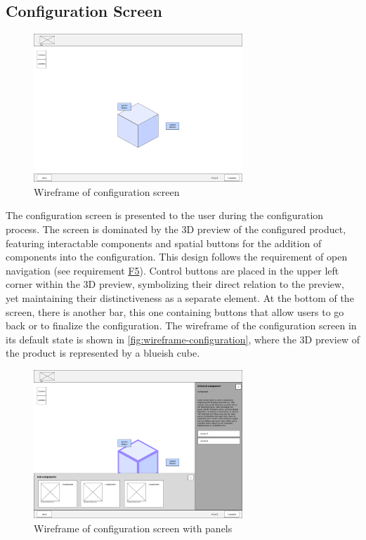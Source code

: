 \subsection{Configuration Screen}

\begin{figure}[h]
\centering
\includegraphics[width=0.7\textwidth]{images/wireframe_configuration_default.png}
\caption{Wireframe of configuration screen}
\label{fig:wireframe-configuration}
\end{figure}


The configuration screen is presented to the user during the configuration process. The screen is dominated by the 3D preview of the configured product, featuring interactable components and spatial buttons for the addition of components into the configuration. This design follows the requirement of open navigation (see requirement \hyperref[itm:F5]{F5}). Control buttons are placed in the upper left corner within the 3D preview, symbolizing their direct relation to the preview, yet maintaining their distinctiveness as a separate element. At the bottom of the screen, there is another bar, this one containing buttons that allow users to go back or to finalize the configuration. The wireframe of the configuration screen in its default state is shown in \autoref{fig:wireframe-configuration}, where the 3D preview of the product is represented by a blueish cube.

\begin{figure}[h]
\centering
\includegraphics[width=0.7\textwidth]{images/wireframe_configuration_panels.png}
\caption{Wireframe of configuration screen with panels}
\label{fig:wireframe-configuration-panels}
\end{figure}

